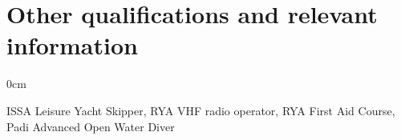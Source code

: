 \documentclass[a4paper,10pt]{article}
\begin{document}

\section{Other qualifications and relevant information}

\begin{minipage}{\textwidth}
\begin{adjustwidth}{}{0cm}

ISSA Leisure Yacht Skipper,
RYA VHF radio operator,
RYA First Aid Course,
Padi Advanced Open Water Diver

\end{adjustwidth}
\end{minipage}

\newpage

\end{document}
